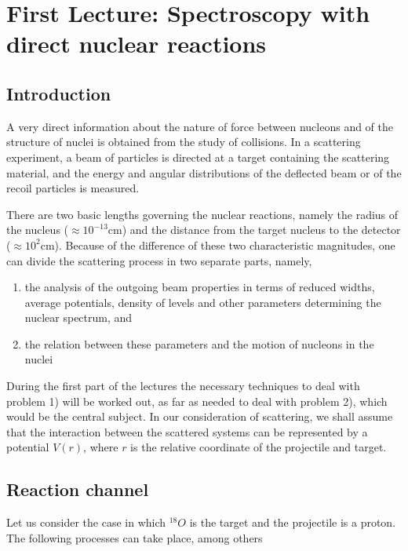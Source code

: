 
\chapter{First Lecture: Spectroscopy with direct nuclear reactions}\label{C2}


\section{Introduction}

A very direct information about the nature of force between nucleons and of the structure of nuclei is obtained from the study of collisions. In a scattering experiment, a beam of particles is directed at a target containing the scattering material, and the energy and angular distributions of the deflected beam or of the recoil particles is measured.

There are two basic lengths governing the nuclear reactions, namely the radius of the nucleus ($\approx 10^{-13}$cm) and the distance from the target nucleus to the detector ($\approx 10^2$cm). Because of the difference of these two characteristic magnitudes, one can divide the scattering process in two separate parts, namely,

\begin{enumerate}
\item{the analysis of the outgoing beam properties in terms of reduced widths, average potentials, density of levels and other parameters determining the nuclear spectrum, and}
\item{the relation between these parameters and the motion of nucleons in the nuclei}
\end{enumerate}

During the first part of the lectures the necessary techniques to deal with problem 1) will be worked out, as far as needed to deal with problem 2), which would be the central subject.
In our consideration of scattering, we shall assume that the interaction between the scattered systems can be represented by a potential $V(r)$, where $r$ is the relative coordinate of the projectile and target.


\section{Reaction channel}

Let us consider the case in which $^{18}O$ is the target and the projectile is a proton. The following processes can take place, among others

